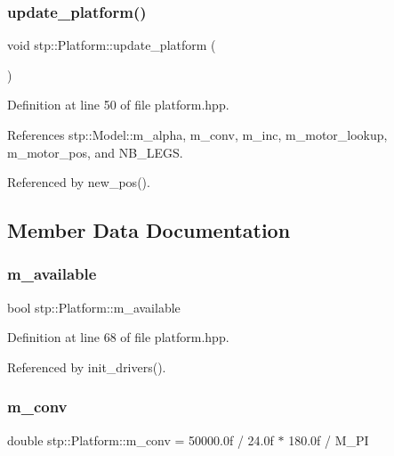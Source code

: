 \subsubsection{\texorpdfstring{update\+\_\+platform()}{update\_platform()}}
{\footnotesize\ttfamily void stp\+::\+Platform\+::update\+\_\+platform (\begin{DoxyParamCaption}{ }\end{DoxyParamCaption})\hspace{0.3cm}{\ttfamily [inline]}}



Definition at line 50 of file platform.\+hpp.



References stp\+::\+Model\+::m\+\_\+alpha, m\+\_\+conv, m\+\_\+inc, m\+\_\+motor\+\_\+lookup, m\+\_\+motor\+\_\+pos, and N\+B\+\_\+\+L\+E\+GS.



Referenced by new\+\_\+pos().



\subsection{Member Data Documentation}
\mbox{\label{classstp_1_1_platform_a7a896535eaa53686f44f50d3dceee967}} 
\subsubsection{\texorpdfstring{m\+\_\+available}{m\_available}}
{\footnotesize\ttfamily bool stp\+::\+Platform\+::m\+\_\+available\hspace{0.3cm}{\ttfamily [private]}}



Definition at line 68 of file platform.\+hpp.



Referenced by init\+\_\+drivers().

\mbox{\label{classstp_1_1_platform_acd6fb6eda2c6606563ad2ba48fabff4b}} 
\subsubsection{\texorpdfstring{m\+\_\+conv}{m\_conv}}
{\footnotesize\ttfamily double stp\+::\+Platform\+::m\+\_\+conv = 50000.\+0f / 24.\+0f $\ast$ 180.\+0f / M\+\_\+\+PI\hspace{0.3cm}{\ttfamily [private]}}



